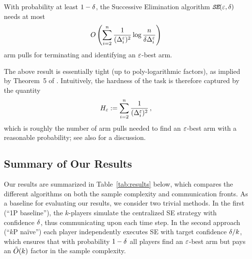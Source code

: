 \documentclass{article}
\begin{document}




\begin{theorem} \label{thm:sebound}
With probability at least $1-\delta$, the Successive Elimination algorithm $\emph{\texttt{SE}}(\varepsilon,\delta)$ needs at most
\begin{align} \label{eq:se_bound}
	O\left(
		\sum_{i=2}^{n} \frac{1}{(\Delta^{\varepsilon}_i)^2} \log \frac{n}{\delta \Delta^{\varepsilon}_i}
	\right)
\end{align}
arm pulls for terminating and identifying an $\varepsilon$-best arm.
\end{theorem}

The above result is essentially tight (up to poly-logarithmic factors), as implied by Theorem~5 of \citet{mannor04}.
Intuitively, the hardness of the task is therefore captured by the quantity
\begin{align} \label{eq:H}
	H_\varepsilon :=
	\sum_{i=2}^{n} \frac{1}{(\Delta^{\varepsilon}_i)^2} \,,
\end{align}
which is roughly the number of arm pulls needed to find an $\varepsilon$-best arm with a reasonable probability; see also \cite{audibert10} for a discussion.




\subsection{Summary of Our Results}

Our results are summarized in Table~\ref{tab:results} below, which compares the different algorithms on both the sample complexity and communication fronts.
As a baseline for evaluating our results, we consider two trivial methods. In the first (``1P baseline''), the $k$-players simulate the centralized SE strategy with confidence $\delta$, thus communicating upon each time step.
In the second approach (``$k$P na\"ive'') each player independently executes SE with target confidence $\delta/k$, which ensures that with probability $1-\delta$ all players find an $\varepsilon$-best arm but pays an $\tilde{O}(k)$ factor in the sample complexity.
\end{document}
